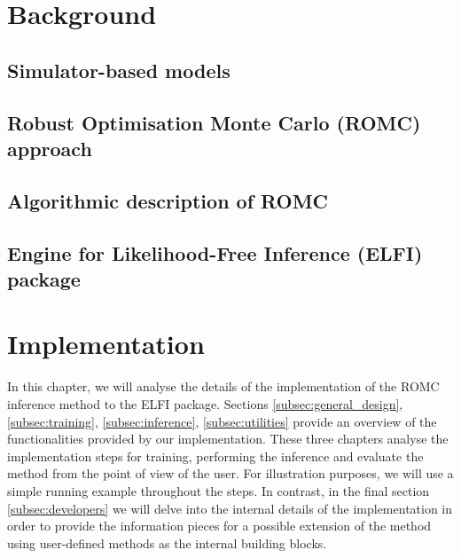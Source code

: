 \documentclass[11pt,twoside]{article}
\numberwithin{Theorem}{section}
\numberwithin{Definition}{section}
\numberwithin{Lemma}{section}
\numberwithin{Algorithm}{section}
\numberwithin{equation}{section}
\begin{document}
\clearpage
\section{Background}
\label{sec:background}

\subsection{Simulator-based models}
% 


\subsection{Robust Optimisation Monte Carlo (ROMC) approach}
\label{sec:ROMC}
% 


\subsection{Algorithmic description of ROMC}
% 


\subsection{Engine for Likelihood-Free Inference (ELFI) package}
\label{subsec:elfi}
% 


\clearpage
\section{Implementation}
In this chapter, we will analyse the details of the implementation of the ROMC inference method to the ELFI package. Sections \ref{subsec:general_design}, \ref{subsec:training}, \ref{subsec:inference}, \ref{subsec:utilities} provide an overview of the functionalities provided by our implementation. These three chapters analyse the implementation steps for training, performing the inference and evaluate the method from the point of view of the user. For illustration purposes, we will use a simple running example throughout the steps. In contrast, in the final section \ref{subsec:developers} we will delve into the internal details of the implementation in order to provide the information pieces for a possible extension of the method using user-defined methods as the internal building blocks.
\end{document}
